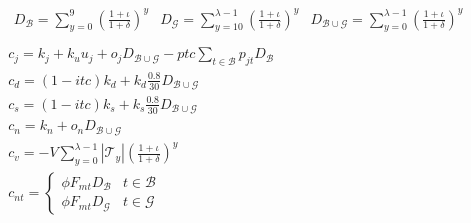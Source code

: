 \documentclass[9pt, oneside]{article}
\numberwithin{equation}{subsubsection}
\begin{document}
\begin{subequations}
	\begin{align}
		 & \begin{array}{lll}
			   D_{\mathcal{B}} = \sum_{y=0}^{9} \left( \frac{1+\iota}{1+\delta} \right)^y & D_{\mathcal{G}} = \sum_{y=10}^{\lambda -1} \left( \frac{1+\iota}{1+\delta} \right)^y & D_{\mathcal{B} \cup \mathcal{G}} = \sum_{y=0}^{\lambda -1} \left( \frac{1+\iota}{1+\delta} \right)^y \\
		   \end{array} \\
		 & c_j = k_j + k_u u_j + o_j D_{\mathcal{B} \cup \mathcal{G}} - ptc \sum_{t\in \mathcal{B}} p_{jt} D_{\mathcal{B}}                                                                                                                                                                                                      \\
		 & c_d = (1-itc) k_d + k_d \frac{0.8}{30} D_{\mathcal{B} \cup \mathcal{G}}                                                                                                                                                                                                                                              \\
		 & c_s = (1-itc) k_s + k_s \frac{0.8}{30} D_{\mathcal{B} \cup \mathcal{G}}                                                                                                                                                                                                                                              \\
		 & c_n = k_n + o_n D_{\mathcal{B} \cup \mathcal{G}}                                                                                                                                                                                                                                                                     \\
		 & c_v = -V \sum_{y=0}^{\lambda -1} |\mathcal{T}_y| \left( \frac{1+\iota}{1+\delta} \right)^y                                                                                                                                                                                                                           \\
		 & c_{nt} = \left\{ \begin{array}{ll}
			                    \phi F_{mt} D_{\mathcal{B}} & t \in \mathcal{B} \\
			                    \phi F_{mt} D_{\mathcal{G}} & t \in \mathcal{G}

\end{array}
\end{align}
\end{subequations}
\end{document}
